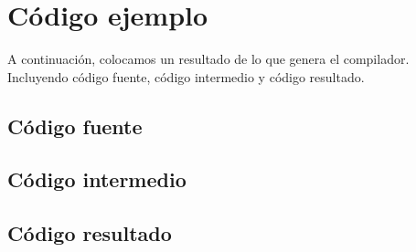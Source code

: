 \documentclass[11pt]{article}
\begin{document}
\pagebreak

\section{Código ejemplo}

A continuación, colocamos un resultado de lo que genera el compilador. Incluyendo código fuente, código intermedio y código resultado. 

\subsection{Código fuente}



\pagebreak

\subsection{Código intermedio}



\pagebreak

\subsection{Código resultado}


\end{document}

